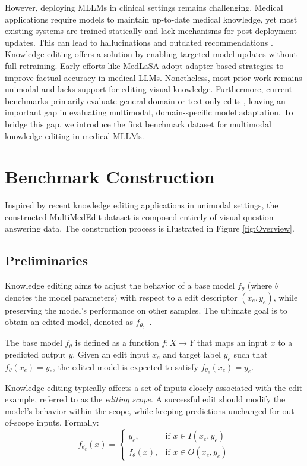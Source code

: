 \documentclass[letterpaper]{article} %
\begin{document}
However, deploying MLLMs in clinical settings remains challenging. Medical applications require models to maintain up-to-date medical knowledge, yet most existing systems are trained statically and lack mechanisms for post-deployment updates. This can lead to hallucinations and outdated recommendations \citep{yan2024probmed,sepehri2024mediconfusion}. Knowledge editing offers a solution by enabling targeted model updates without full retraining. Early efforts like MedLaSA \citep{xu2024editingmedicalllms} adopt adapter-based strategies to improve factual accuracy in medical LLMs. Nonetheless, most prior work remains unimodal and lacks support for editing visual knowledge. Furthermore, current benchmarks primarily evaluate general-domain or text-only edits \citep{he2024mmllms,hu2024omnimedvqa}, leaving an important gap in evaluating multimodal, domain-specific model adaptation. To bridge this gap, we introduce the first benchmark dataset for multimodal knowledge editing in medical MLLMs.

\section{Benchmark Construction}
Inspired by recent knowledge editing applications in unimodal settings, the constructed MultiMedEdit dataset is composed entirely of visual question answering data. The construction process is illustrated in Figure \ref{fig:Overview}.



\subsection{Preliminaries}

Knowledge editing aims to adjust the behavior of a base model $f_\theta$ (where $\theta$ denotes the model parameters) with respect to a edit descriptor $(x_e, y_e)$, while preserving the model’s performance on other samples. The ultimate goal is to obtain an edited model, denoted as $f_{\theta_e}$~\cite{yao2023editing}.

The base model $f_\theta$ is defined as a function $f: X \to Y$ that maps an input $x$ to a predicted output $y$. Given an edit input $x_e$ and target label $y_e$ such that $f_\theta(x_e) = y_e$, the edited model is expected to satisfy $f_{\theta_e}(x_e) = y_e$.

Knowledge editing typically affects a set of inputs closely associated with the edit example, referred to as the \textit{editing scope}. A successful edit should modify the model’s behavior within the scope, while keeping predictions unchanged for out-of-scope inputs. Formally:
\begin{equation}
f_{\theta_e}(x) = 
\left\{
\begin{array}{ll}
y_e, & \text{if } x \in I(x_e, y_e) \\
f_\theta(x), & \text{if } x \in O(x_e, y_e)
\end{array}
\right.
\end{equation}
\end{document}
